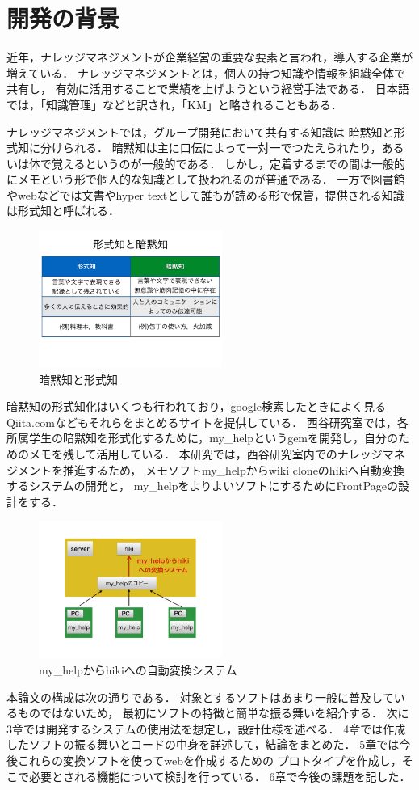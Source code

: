 \section{開発の背景}
近年，ナレッジマネジメントが企業経営の重要な要素と言われ，導入する企業が増えている．
ナレッジマネジメントとは，個人の持つ知識や情報を組織全体で共有し，
有効に活用することで業績を上げようという経営手法である．
日本語では，「知識管理」などと訳され，「KM」と略されることもある\cite{a}．

ナレッジマネジメントでは，グループ開発において共有する知識は
暗黙知と形式知に分けられる\cite{b}．
暗黙知は主に口伝によって一対一でつたえられたり，あるいは体で覚えるというのが一般的である．
しかし，定着するまでの間は一般的にメモという形で個人的な知識として扱われるのが普通である．
一方で図書館やwebなどでは文書やhyper textとして誰もが読める形で保管，提供される知識は形式知と呼ばれる．

\begin{figure}[htbp]
\begin{center}
\includegraphics[width=6cm,bb=100 100 600 700]{my_help2hiki_saki.001.png}
\caption{暗黙知と形式知}
\label{default}\end{center}\end{figure}


暗黙知の形式知化はいくつも行われており，google検索したときによく見るQiita.comなどもそれらをまとめるサイトを提供している．
西谷研究室では，各所属学生の暗黙知を形式化するために，my\_helpというgemを開発し，自分のためのメモを残して活用している．
本研究では，西谷研究室内でのナレッジマネジメントを推進するため，
メモソフトmy\_helpからwiki cloneのhikiへ自動変換するシステムの開発と，
my\_helpをよりよいソフトにするためにFrontPageの設計をする．

\begin{figure}[htbp]
\begin{center}
\includegraphics[width=6cm,bb=100 100 600 700]{my_help2hiki_saki.011.png}
\caption{my\_helpからhikiへの自動変換システム}
\label{default}\end{center}\end{figure}

本論文の構成は次の通りである．
対象とするソフトはあまり一般に普及しているものではないため，
最初にソフトの特徴と簡単な振る舞いを紹介する．
次に3章では開発するシステムの使用法を想定し，設計仕様を述べる．
4章では作成したソフトの振る舞いとコードの中身を詳述して，結論をまとめた．
5章では今後これらの変換ソフトを使ってwebを作成するための
プロトタイプを作成し，そこで必要とされる機能について検討を行っている．
6章で今後の課題を記した．

